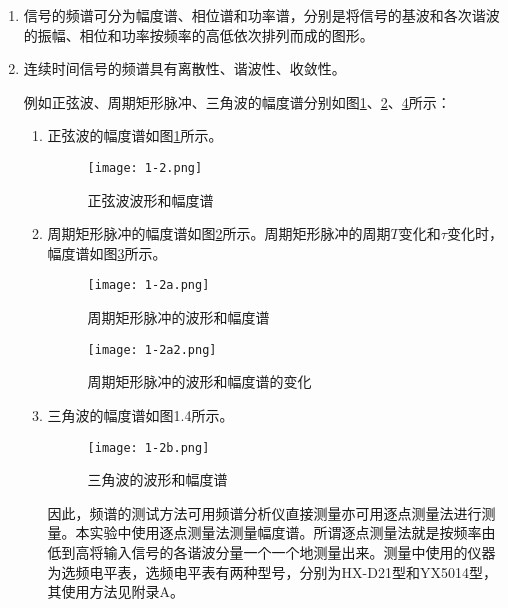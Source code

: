 \begin{enumerate}
	\item 信号的频谱可分为幅度谱、相位谱和功率谱，分别是将信号的基波和各次谐波的振幅、相位和功率按频率的高低依次排列而成的图形。
	\item 连续时间信号的频谱具有离散性、谐波性、收敛性。

		例如正弦波、周期矩形脉冲、三角波的幅度谱分别如图\ref{fig:正弦波波形和幅度谱}、\ref{fig:周期矩形脉冲的波形和幅度谱}、\ref{fig:三角波的波形和幅度谱}所示：

		\begin{enumerate}
			\item 正弦波的幅度谱如图\ref{fig:正弦波波形和幅度谱}所示。

				\begin{figure}[htpb]
					\centering
					\texttt{[image: 1-2.png]}
					\caption{正弦波波形和幅度谱}
					\label{fig:正弦波波形和幅度谱}
				\end{figure}

			\item 周期矩形脉冲的幅度谱如图\ref{fig:周期矩形脉冲的波形和幅度谱}所示。周期矩形脉冲的周期$ T $变化和$ \tau $变化时，幅度谱如图\ref{fig:周期矩形脉冲的波形和幅度谱的变化}所示。

				\begin{figure}[htpb]
					\centering
					\texttt{[image: 1-2a.png]}
					\caption{周期矩形脉冲的波形和幅度谱}
					\label{fig:周期矩形脉冲的波形和幅度谱}
				\end{figure}

				\begin{figure}[htpb]
					\centering
					\texttt{[image: 1-2a2.png]}
					\caption{周期矩形脉冲的波形和幅度谱的变化}
					\label{fig:周期矩形脉冲的波形和幅度谱的变化}
				\end{figure}

			\item 三角波的幅度谱如图1.4所示。

				\begin{figure}[htpb]
					\centering
					\texttt{[image: 1-2b.png]}
					\caption{三角波的波形和幅度谱}
					\label{fig:三角波的波形和幅度谱}
				\end{figure}

				因此，频谱的测试方法可用频谱分析仪直接测量亦可用逐点测量法进行测量。本实验中使用逐点测量法测量幅度谱。所谓逐点测量法就是按频率由低到高将输入信号的各谐波分量一个一个地测量出来。测量中使用的仪器为选频电平表，选频电平表有两种型号，分别为HX-D21型和YX5014型，其使用方法见附录A。
		\end{enumerate}
\end{enumerate}

